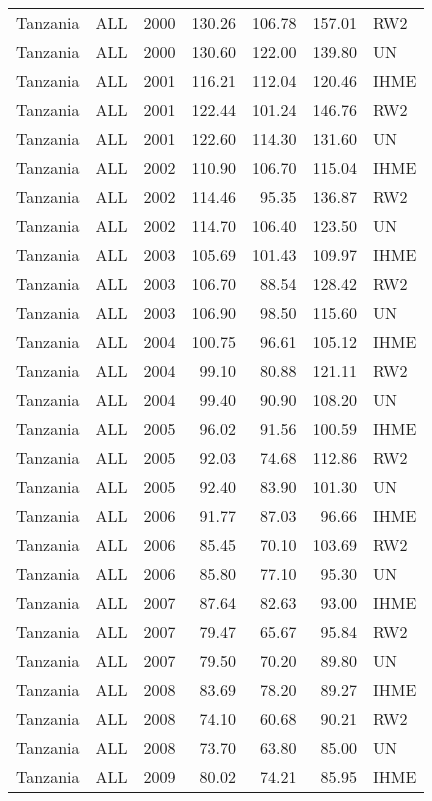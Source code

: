 \begin{longtable}{lllrrrl}
  Tanzania & ALL & 2000 & 130.26 & 106.78 & 157.01 & RW2 \\ 
  Tanzania & ALL & 2000 & 130.60 & 122.00 & 139.80 & UN \\ 
  Tanzania & ALL & 2001 & 116.21 & 112.04 & 120.46 & IHME \\ 
  Tanzania & ALL & 2001 & 122.44 & 101.24 & 146.76 & RW2 \\ 
  Tanzania & ALL & 2001 & 122.60 & 114.30 & 131.60 & UN \\ 
  Tanzania & ALL & 2002 & 110.90 & 106.70 & 115.04 & IHME \\ 
  Tanzania & ALL & 2002 & 114.46 & 95.35 & 136.87 & RW2 \\ 
  Tanzania & ALL & 2002 & 114.70 & 106.40 & 123.50 & UN \\ 
  Tanzania & ALL & 2003 & 105.69 & 101.43 & 109.97 & IHME \\ 
  Tanzania & ALL & 2003 & 106.70 & 88.54 & 128.42 & RW2 \\ 
  Tanzania & ALL & 2003 & 106.90 & 98.50 & 115.60 & UN \\ 
  Tanzania & ALL & 2004 & 100.75 & 96.61 & 105.12 & IHME \\ 
  Tanzania & ALL & 2004 & 99.10 & 80.88 & 121.11 & RW2 \\ 
  Tanzania & ALL & 2004 & 99.40 & 90.90 & 108.20 & UN \\ 
  Tanzania & ALL & 2005 & 96.02 & 91.56 & 100.59 & IHME \\ 
  Tanzania & ALL & 2005 & 92.03 & 74.68 & 112.86 & RW2 \\ 
  Tanzania & ALL & 2005 & 92.40 & 83.90 & 101.30 & UN \\ 
  Tanzania & ALL & 2006 & 91.77 & 87.03 & 96.66 & IHME \\ 
  Tanzania & ALL & 2006 & 85.45 & 70.10 & 103.69 & RW2 \\ 
  Tanzania & ALL & 2006 & 85.80 & 77.10 & 95.30 & UN \\ 
  Tanzania & ALL & 2007 & 87.64 & 82.63 & 93.00 & IHME \\ 
  Tanzania & ALL & 2007 & 79.47 & 65.67 & 95.84 & RW2 \\ 
  Tanzania & ALL & 2007 & 79.50 & 70.20 & 89.80 & UN \\ 
  Tanzania & ALL & 2008 & 83.69 & 78.20 & 89.27 & IHME \\ 
  Tanzania & ALL & 2008 & 74.10 & 60.68 & 90.21 & RW2 \\ 
  Tanzania & ALL & 2008 & 73.70 & 63.80 & 85.00 & UN \\ 
  Tanzania & ALL & 2009 & 80.02 & 74.21 & 85.95 & IHME \\ 

\end{longtable}

